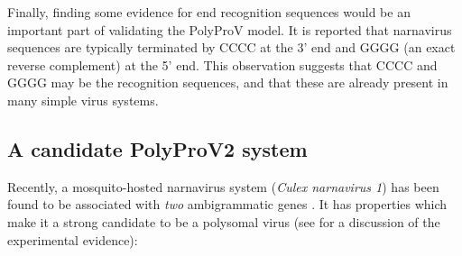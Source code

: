 \documentclass[12pt]{iopart}
\begin{document}
Finally, finding some evidence for end recognition sequences would be an important 
part of validating the PolyProV model. It is reported that narnavirus sequences are 
typically terminated by CCCC at the 3' end and GGGG (an exact reverse complement) 
at the 5' end.  This observation suggests that CCCC and GGGG may be the recognition 
sequences, and that these are already present in many simple virus systems. 

\subsection{A candidate PolyProV2 system}
\label{sec: 3.3}

Recently, a mosquito-hosted narnavirus system (\emph{Culex narnavirus 1}) has been found to be associated with 
\emph{two} ambigrammatic genes \cite{Bat+20,Ret+20}. It has properties which make it a strong 
candidate to be a polysomal virus (see \cite{Bat+20,Ret+20} for a discussion of the experimental evidence):
\end{document}
